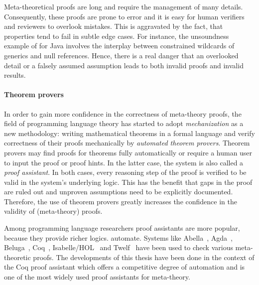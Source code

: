 {Meta-theoretical proofs are long and require the management of many details.
Consequently, these proofs are prone to error and it is easy for human verifiers
and reviewers to overlook mistakes. This is aggravated by the fact, that
properties tend to fail in subtle edge cases. For instance, the unsoundness
example of \cite{amin2016java} for Java involves the interplay between
constrained wildcards of generics and null references. Hence, there is a real
danger that an overlooked detail or a falsely assumed assumption leads to both
invalid proofs and invalid results.

\paragraph{Theorem provers}
In order to gain more confidence in the correctness of meta-theory proofs, the
field of programming language theory has started to adopt \emph{mechanization}
as a new methodology: writing mathematical theorems in a formal language and
verify correctness of their proofs mechanically by \emph{automated theorem
  provers}. Theorem provers may find proofs for theorems fully automatically or
require a human user to input the proof or proof hints. In the latter case, the
system is also called a \emph{proof assistant}. In both cases, every reasoning
step of the proof is verified to be valid in the system's underlying logic. This
has the benefit that gaps in the proof are ruled out and unproven assumptions
need to be explicitly documented. Therefore, the use of theorem provers greatly
increases the confidence in the validity of (meta-theory) proofs.


Among programming language researchers proof assistants are more popular,
because they provide richer logics. %
automate. Systems like Abella~\cite{abella}, Agda~\cite{norellthesis},
Beluga~\cite{beluga}, Coq~\cite{coq}, Isabelle/HOL~\cite{isabelle} and
Twelf~\cite{twelf} have been used to check various meta-theoretic proofs. The
developments of this thesis have been done in the context of the Coq proof
assistant which offers a competitive degree of automation and is one of the most
widely used proof assistants for meta-theory.

}
